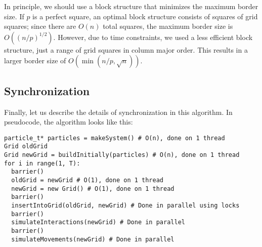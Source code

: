 \documentclass{article}
\begin{document}
In principle, we should use a block structure that minimizes the maximum border size.  If $p$ is a perfect square, an optimal block structure consists of squares of grid squares; since there are $O(n)$ total squares, the maximum border size is $O((n/p)^{1/2})$.  However, due to time constraints, we used a less efficient block structure, just a range of grid squares in column major order.  This results in a larger border size of $O(\min(n/p, \sqrt{n}))$.

\subsection{Synchronization}
Finally, let us describe the details of synchronization in this algorithm.  In pseudocode, the algorithm looks like this:

\begin{verbatim}
particle_t* particles = makeSystem() # O(n), done on 1 thread
Grid oldGrid
Grid newGrid = buildInitially(particles) # O(n), done on 1 thread
for i in range(1, T):
  barrier()
  oldGrid = newGrid # O(1), done on 1 thread
  newGrid = new Grid() # O(1), done on 1 thread
  barrier()
  insertIntoGrid(oldGrid, newGrid) # Done in parallel using locks
  barrier()
  simulateInteractions(newGrid) # Done in parallel
  barrier()
  simulateMovements(newGrid) # Done in parallel
\end{verbatim}
\end{document}
